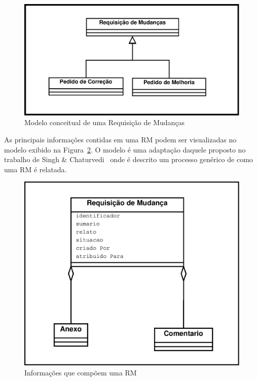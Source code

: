 \begin{figure}[htpb]
	\centering
	\includegraphics[width=0.8\linewidth]{./chapter-manutencao-software-visao-geral/img/diagrama-classe-conceitual-requisicao-mudancas.pdf}
	\caption{Modelo conceitual de uma Requisição de Mudanças}
\label{fig:diagrama-classe-requisicao-mudancas}
\end{figure}
\todoend{}

As principais informações contidas em uma RM podem ser visualizadas no modelo
exibido na Figura~\ref{fig:diagrama-classe-atributos-requisicao-mudancas}. O
modelo é uma adaptação daquele proposto no trabalho de Singh \&
Chaturvedi~\cite{singh2011bug} onde é descrito um processo genérico de como uma
RM é relatada.

\begin{figure}[htpb]
	\centering
	\includegraphics[width=0.8\linewidth]{./chapter-manutencao-software-visao-geral/img/diagrama-classe-atributos-requisicao-mudancas.pdf}
	\caption{Informações que compõem uma RM}
\label{fig:diagrama-classe-atributos-requisicao-mudancas}
\end{figure}


